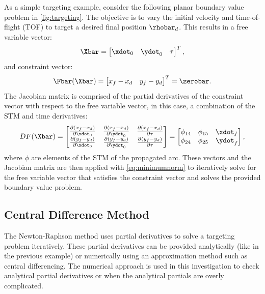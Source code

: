 As a simple targeting example, consider the following planar boundary value problem in
\cref{fig:targeting}. The objective is to vary the initial velocity and time-of-flight (TOF) to
target a desired final position $\rhobar_{d}$. This results in a free variable vector:
\begin{equation}
    \Xbar=\begin{bmatrix}   \xdot_{0}   &   \ydot_{0}   &   \tau    \end{bmatrix}^{T},
    \label{eq:exfreevar}
\end{equation}
and constraint vector:
\begin{equation}
    \Fbar(\Xbar)=\begin{bmatrix}    x_{f}-x_{d} &   y_{f}-y_{d} \end{bmatrix}^{T}=\zerobar.
    \label{eq:exconst}
\end{equation}
The Jacobian matrix is comprised of the partial derivatives of the constraint vector with respect
to the free variable vector, in this case, a combination of the STM and time derivatives:
\begin{equation}
    DF(\Xbar)=\begin{bmatrix}   \frac{\partial(x_{f}-x_{d})}{\partial\xdot_{0}} &   \frac{\partial(x_{f}-x_{d})}{\partial\ydot_{0}} &   \frac{\partial(x_{f}-x_{d})}{\partial\tau}  \\
                                \frac{\partial(y_{f}-y_{d})}{\partial\xdot_{0}} &   \frac{\partial(y_{f}-y_{d})}{\partial\ydot_{0}} &   \frac{\partial(y_{f}-y_{d})}{\partial\tau}  \end{bmatrix}
             =\begin{bmatrix}   \phi_{14}                                       &   \phi_{15}                                       &   \xdot_{f}                                   \\
                                \phi_{24}                                       &   \phi_{25}                                       &   \ydot_{f}                                   \end{bmatrix},
    \label{eq:exJacobian}
\end{equation}
where $\phi$ are elements of the STM of the propagated arc. These vectors and the Jacobian matrix
are then applied with \cref{eq:minimumnorm} to iteratively solve for the free variable vector that
satisfies the constraint vector and solves the provided boundary value problem.

\subsection{Central Difference Method}
The Newton-Raphson method uses partial derivatives to solve a targeting problem iteratively. These
partial derivatives can be provided analytically (like in the previous example) or numerically
using an approximation method such as central differencing. The numerical approach is used in this
investigation to check analytical partial derivatives or when the analytical partials are overly
complicated.

